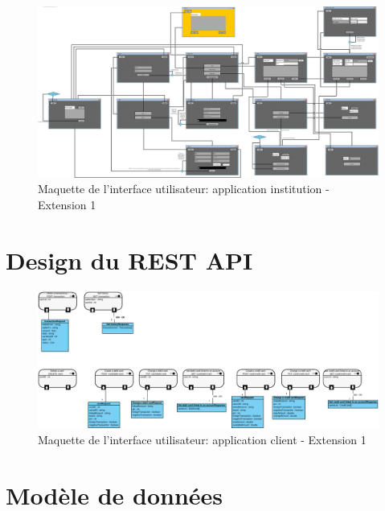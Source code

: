 \documentclass[]{report}
\begin{document}
\begin{figure}[h!]
	\centering\includegraphics[width=\linewidth]{img/ui-institution-Extension-1.pdf}
	\caption{Maquette de l'interface utilisateur: application institution - Extension 1}
\end{figure}


\newpage
\section{Design du REST API}

\begin{figure}[h!]
	\centering\includegraphics[width=\linewidth]{img/rest-api-Extension-1.pdf}
	\caption{Maquette de l'interface utilisateur: application client - Extension 1}
\end{figure}



\newpage

\section{Modèle de données}
\end{document}
